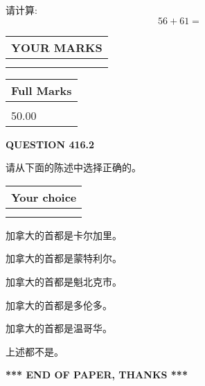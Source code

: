\documentclass{ctexart}
\begin{document}
  
 
请计算:
\begin{equation}
56 +  %
61 = \nonumber
\end{equation}
 

 

 
  
\vspace{0.2in}
  
\noindent\begin{tabular}{|l|}
\hline
 YOUR MARKS  \\
\hline
 \\ 
 \\ 
\hline
\end{tabular}
\hspace{0.05in} \begin{tabular}{|l|}
\hline
 Full Marks  \\
\hline
 \\ 
50.00 \\
\hline
\end{tabular}
{\textbf{\Large{QUESTION
416.2 
}}}
  
  
请从下面的陈述中选择正确的。
  
  
\noindent\hspace{3.0in} \begin{tabular}{|l|}
\hline
Your choice \\
\hline
 \\ 
 \\ 
\hline
\end{tabular}
  
  
 
 
加拿大的首都是卡尔加里。
 
 
加拿大的首都是蒙特利尔。
 
 
加拿大的首都是魁北克市。
 
 
加拿大的首都是多伦多。
 
 
加拿大的首都是温哥华。
 
 
 上述都不是。
 
 
   
   
 \vspace{0.2in}
 
   
   
   
   
\vspace{1.0in} 
{\textbf{\large{ *** END OF PAPER, THANKS *** }}} 
   
\end{document}
